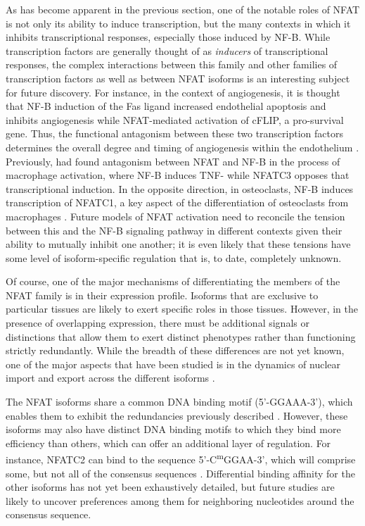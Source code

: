 As has become apparent in the previous section, one of the notable roles of NFAT is not only its ability to induce transcription, but the many contexts in which it inhibits transcriptional responses, especially those induced by NF-\textkappa B. While transcription factors are generally thought of as \textit{inducers} of transcriptional responses, the complex interactions between this family and other families of transcription factors as well as between NFAT isoforms is an interesting subject for future discovery. For instance, in the context of angiogenesis, it is thought that NF-\textkappa B induction of the Fas ligand increased endothelial apoptosis and inhibits angiogenesis while NFAT-mediated activation of cFLIP, a pro-survival gene. Thus, the functional antagonism between these two transcription factors determines the overall degree and timing of angiogenesis within the endothelium \citep{Aurora2010}. Previously, \citet{Conboy1999} had found antagonism between NFAT and NF-\textkappa B in the process of macrophage activation, where NF-\textkappa B induces TNF-\textalpha{} while NFATC3 opposes that transcriptional induction. In the opposite direction, in osteoclasts, NF-\textkappa B induces transcription of NFATC1, a key aspect of the differentiation of osteoclasts from macrophages \citep{Asagiri2005}. Future models of NFAT activation need to reconcile the tension between this and the NF-\textkappa B signaling pathway in different contexts given their ability to mutually inhibit one another; it is even likely that these tensions have some level of isoform-specific regulation that is, to date, completely unknown. 

Of course, one of the major mechanisms of differentiating the members of the NFAT family is in their expression profile. Isoforms that are exclusive to particular tissues are likely to exert specific roles in those tissues. However, in the presence of overlapping expression, there must be additional signals or distinctions that allow them to exert distinct phenotypes rather than functioning strictly redundantly. While the breadth of these differences are not yet known, one of the major aspects that have been studied is in the dynamics of nuclear import and export across the different isoforms \citep{Chow1997, Yissachar2013, Kar2015, Kar2016}. 

The NFAT isoforms share a common DNA binding motif (5'-GGAAA-3'), which enables them to exhibit the redundancies previously described \citep{Rao1997}. However, these isoforms may also have distinct DNA binding motifs to which they bind more efficiency than others, which can offer an additional layer of regulation. For instance, NFATC2 can bind to the sequence 5'-C\textsuperscript{m}GGAA-3', which will comprise some, but not all of the consensus sequences \citep{Ray2021}. Differential binding affinity for the other isoforms has not yet been exhaustively detailed, but future studies are likely to uncover preferences among them for neighboring nucleotides around the consensus sequence.


